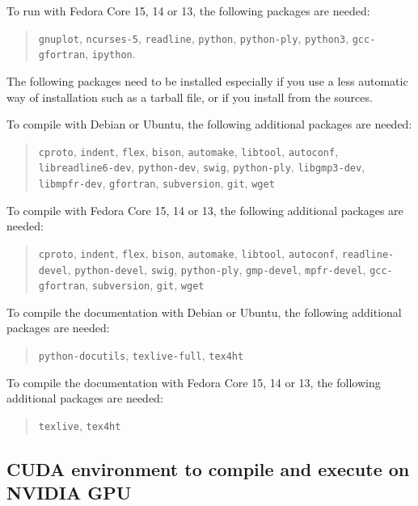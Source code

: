 \documentclass[a4paper]{article}
\begin{document}
To run \Apfa with Fedora Core 15, 14 or 13, the following packages are needed:
\begin{quote}
 \texttt{gnuplot}, \texttt{ncurses-5}, \texttt{readline}, \texttt{python},
  \texttt{python-ply}, \texttt{python3}, \texttt{gcc-gfortran},
  \texttt{ipython}.
\end{quote}

The following packages need to be installed especially if you use a less
automatic way of installation such as a tarball file, or if you install
from the sources.


To compile \Apfa with Debian or Ubuntu, the following additional
packages are needed:
\begin{quote}
  \texttt{cproto}, \texttt{indent}, \texttt{flex}, \texttt{bison},
  \texttt{automake}, \texttt{libtool}, \texttt{autoconf},
  \texttt{libreadline6-dev}, \texttt{python-dev}, \texttt{swig},
  \texttt{python-ply}, \texttt{libgmp3-dev},
  \texttt{libmpfr-dev}, \texttt{gfortran}, \texttt{subversion},
  \texttt{git}, \texttt{wget}
\end{quote}

To compile \Apfa with Fedora Core 15, 14 or 13, the following additional
packages are needed:
\begin{quote}
  \texttt{cproto}, \texttt{indent}, \texttt{flex}, \texttt{bison},
  \texttt{automake}, \texttt{libtool}, \texttt{autoconf},
  \texttt{readline-devel}, \texttt{python-devel}, \texttt{swig},
  \texttt{python-ply}, \texttt{gmp-devel},
  \texttt{mpfr-devel}, \texttt{gcc-gfortran}, \texttt{subversion},
  \texttt{git}, \texttt{wget}
\end{quote}

To compile the documentation with Debian or Ubuntu, the following
additional packages are needed:
\begin{quote}
  \texttt{python-docutils}, \texttt{texlive-full}, \texttt{tex4ht}
\end{quote}

To compile the documentation with Fedora Core 15, 14 or 13, the following
additional packages are needed:
\begin{quote}
  \texttt{texlive}, \texttt{tex4ht}
\end{quote}


\subsection{CUDA environment to compile and execute on NVIDIA GPU}
\end{document}
